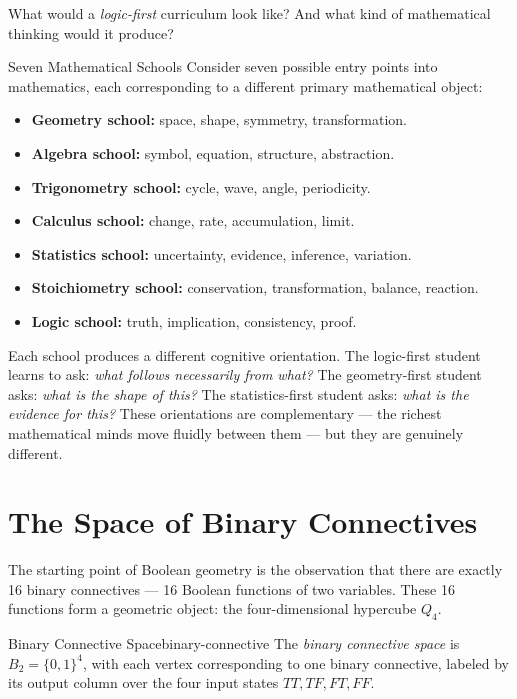 What would a \emph{logic-first} curriculum look like? And what kind
of mathematical thinking would it produce?

\begin{conceptaside}{Seven Mathematical Schools}
  Consider seven possible entry points into mathematics, each
  corresponding to a different primary mathematical object:
  \begin{itemize}
    \item \textbf{Geometry school:} space, shape, symmetry, transformation.
    \item \textbf{Algebra school:} symbol, equation, structure, abstraction.
    \item \textbf{Trigonometry school:} cycle, wave, angle, periodicity.
    \item \textbf{Calculus school:} change, rate, accumulation, limit.
    \item \textbf{Statistics school:} uncertainty, evidence, inference,
          variation.
    \item \textbf{Stoichiometry school:} conservation, transformation,
          balance, reaction.
    \item \textbf{Logic school:} truth, implication, consistency, proof.
  \end{itemize}
  Each school produces a different cognitive orientation. The logic-first
  student learns to ask: \emph{what follows necessarily from what?}
  The geometry-first student asks: \emph{what is the shape of this?}
  The statistics-first student asks: \emph{what is the evidence for this?}
  These orientations are complementary — the richest mathematical minds
  move fluidly between them — but they are genuinely different.
\end{conceptaside}

\section{The Space of Binary Connectives}

The starting point of Boolean geometry is the observation that there
are exactly 16 binary connectives — 16 Boolean functions of two variables.
These 16 functions form a geometric object: the four-dimensional hypercube
$Q_4$.

\begin{definition}{Binary Connective Space}{binary-connective}
  The \emph{binary connective space} is $B_2 = \{0,1\}^4$, with each
  vertex corresponding to one binary connective, labeled by its output
  column over the four input states $TT, TF, FT, FF$.
\end{definition}

